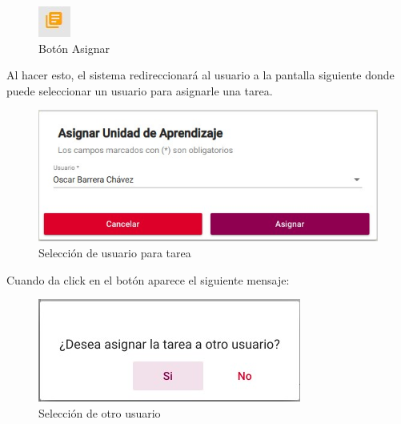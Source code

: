         \begin{figure}[H]
            \centering
            \hypertarget{boton}{\includegraphics[width=0.7\linewidth]{images/Tareas/boton}}
            \caption{Botón Asignar}
            \label{boton}
        \end{figure}

        Al hacer esto, el sistema redireccionará al usuario a la pantalla siguiente donde puede seleccionar un usuario para asignarle una tarea.

        \begin{figure}[H]
            \centering
            \hypertarget{asigna}{\includegraphics[width=0.7\linewidth]{images/Tareas/Asignando}}
            \caption{Selección de usuario para tarea}
            \label{asigna}
        \end{figure}

       Cuando da click en el botón  aparece el siguiente mensaje:
        \begin{figure}[H]
            \centering
            \hypertarget{asignar}{\includegraphics[width=0.7\linewidth]{images/Tareas/Asignarotro}}
            \caption{Selección de otro usuario}
            \label{asignar}
        \end{figure}

